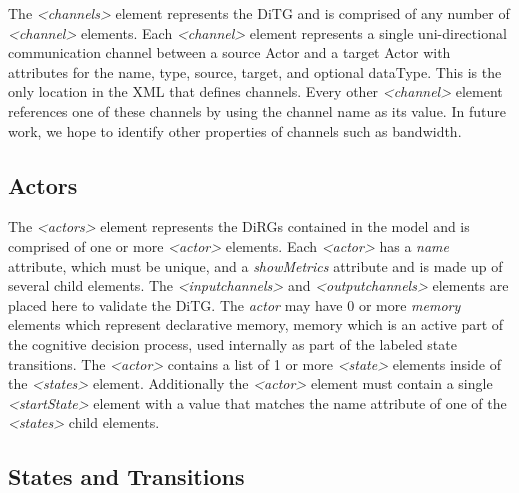 The {\em \textless channels\textgreater} element represents the DiTG and is comprised of any number of {\em \textless channel\textgreater} elements.  Each {\em \textless channel\textgreater} element represents a single uni-directional communication channel between a source Actor and a target Actor with attributes for the name, type, source, target, and optional dataType.  This is the only location in the XML that defines channels.  Every other {\em \textless channel\textgreater} element references one of these channels by using the channel name as its value.  In future work, we hope to identify other properties of channels such as bandwidth.

\begin{spacing}{.5}

\end{spacing}

\subsection{Actors}

The {\em \textless actors\textgreater} element represents the DiRGs contained in the model and is comprised of one or more {\em \textless actor\textgreater} elements.  Each {\em \textless actor\textgreater} has a {\em name} attribute, which must be unique, and a {\em showMetrics} attribute and is made up of several child elements.  The {\em \textless inputchannels\textgreater} and {\em \textless outputchannels\textgreater} elements are placed here to validate the DiTG.  The {\em actor} may have 0 or more {\em memory} elements which represent declarative memory, memory which is an active part of the cognitive decision process, used internally as part of the labeled state transitions.  The {\em \textless actor\textgreater} contains a list of 1 or more {\em \textless state\textgreater} elements inside of the {\em \textless states\textgreater} element.  Additionally the {\em \textless actor\textgreater} element must contain a single {\em \textless startState\textgreater} element with a value that matches the name attribute of one of the {\em \textless states\textgreater} child elements.

\begin{spacing}{.5}

\end{spacing}


\subsection{States and Transitions}

